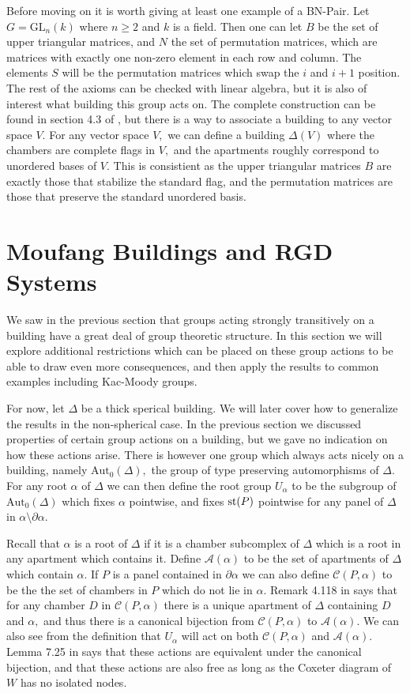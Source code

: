\documentclass[class=book, crop=false,12 pt]{standalone}
\begin{document}
Before moving on it is worth giving at least one example of a BN-Pair. Let $G=\mathrm{GL}_n(k)$ where $n\ge 2$ and $k$ is a field. Then one can let $B$ be the set of upper triangular matrices, and $N$ the set of permutation matrices, which are matrices with exactly one non-zero element in each row and column. The elements $S$ will be the permutation matrices which swap the $i$ and $i+1$ position. The rest of the axioms can be checked with linear algebra, but it is also of interest what building this group acts on. The complete construction can be found in section 4.3 of \cite{buildings}, but there is a way to associate a building to any vector space $V.$ For any vector space $V,$ we can define a building $\Delta(V)$ where the chambers are complete flags in $V,$ and the apartments roughly correspond to unordered bases of $V.$ This is consistient as the upper triangular matrices $B$ are exactly those that stabilize the standard flag, and the permutation matrices are those that preserve the standard unordered basis.

\section{Moufang Buildings and RGD Systems}
We saw in the previous section that groups acting strongly transitively on a building have a great deal of group theoretic structure. In this section we will explore additional restrictions which can be placed on these group actions to be able to draw even more consequences, and then apply the results to common examples including Kac-Moody groups.

For now, let $\Delta$ be a thick sperical building. We will later cover how to generalize the results in the non-spherical case. In the previous section we discussed properties of certain group actions on a building, but we gave no indication on how these actions arise. There is however one group which always acts nicely on a building, namely $\mathrm{Aut}_0(\Delta),$ the group of type preserving automorphisms of $\Delta.$ For any root $\alpha$ of $\Delta$ we can then define the root group $U_\alpha$ to be the subgroup of $\mathrm{Aut}_0(\Delta)$ which fixes $\alpha$ pointwise, and fixes $\mathrm{st}(P)$ pointwise for any panel of $\Delta$ in $\alpha\setminus \partial\alpha.$

Recall that $\alpha$ is a root of $\Delta$ if it is a chamber subcomplex of $\Delta$ which is a root in any apartment which contains it. Define $\mathcal{A}(\alpha)$ to be the set of apartments of $\Delta$ which contain $\alpha.$ If $P$ is a panel contained in $\partial\alpha$ we can also define $\mathcal{C}(P,\alpha)$ to be the the set of chambers in $P$ which do not lie in $\alpha.$ Remark 4.118 in \cite{buildings} says that for any chamber $D$ in $\mathcal{C}(P,\alpha)$ there is a unique apartment of $\Delta$ containing $D$ and $\alpha,$ and thus there is a canonical bijection from $\mathcal{C}(P,\alpha)$ to $\mathcal{A}(\alpha).$ We can also see from the definition that $U_\alpha$ will act on both $\mathcal{C}(P,\alpha)$ and $\mathcal{A}(\alpha).$ Lemma 7.25 in \cite{buildings} says that these actions are equivalent under the canonical bijection, and that these actions are also free as long as the Coxeter diagram of $W$ has no isolated nodes. 
\end{document}
